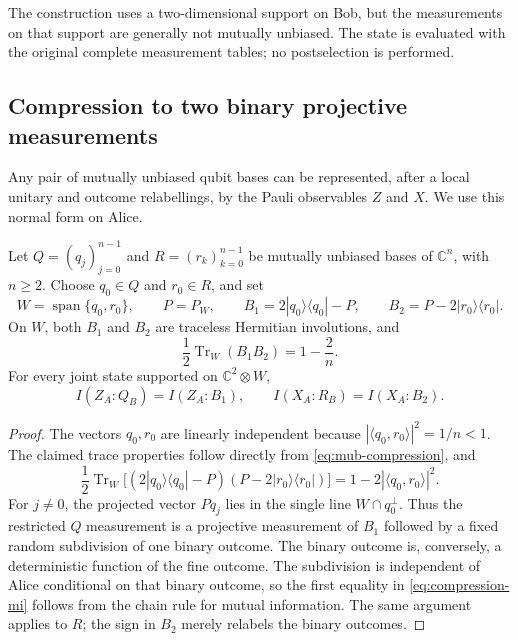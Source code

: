 The construction uses a two-dimensional support on Bob, but the
measurements on that support are generally not mutually unbiased.
The state is evaluated with the original complete measurement tables;
no postselection is performed.

\subsection{Compression to two binary projective measurements}
\label{sec:compression}

Any pair of mutually unbiased qubit bases can be represented, after a
local unitary and outcome relabellings, by the Pauli observables $Z$ and
$X$.  We use this normal form on Alice.

\begin{lemma}
\label{lem:binary-compression}
 Let $Q=(q_j)_{j=0}^{n-1}$ and $R=(r_k)_{k=0}^{n-1}$ be mutually
 unbiased bases of $\mathbb C^n$, with $n\geq2$.  Choose $q_0\in Q$ and
 $r_0\in R$, and set
 \begin{equation}
  W=\operatorname{span}\{q_0,r_0\},\qquad P=P_W,
  \qquad B_1=2|q_0\rangle\langle q_0|-P,
  \qquad B_2=P-2|r_0\rangle\langle r_0|.
  \label{eq:mub-compression}
 \end{equation}
 On $W$, both $B_1$ and $B_2$ are traceless Hermitian involutions, and
 \begin{equation}
  \frac12\operatorname{Tr}_W(B_1B_2)=1-\frac2n.
  \label{eq:compressed-overlap}
 \end{equation}
 For every joint state supported on $\mathbb C^2\otimes W$,
 \begin{equation}
  I(Z_A:Q_B)=I(Z_A:B_1),\qquad
  I(X_A:R_B)=I(X_A:B_2).
  \label{eq:compression-mi}
 \end{equation}
\end{lemma}

\begin{proof}
 The vectors $q_0,r_0$ are linearly independent because
 $|\langle q_0,r_0\rangle|^2=1/n<1$.  The claimed trace properties
 follow directly from \eqref{eq:mub-compression}, and
 \[
  \frac12\operatorname{Tr}_W
  \bigl[(2|q_0\rangle\langle q_0|-P)
  (P-2|r_0\rangle\langle r_0|)\bigr]
  =1-2|\langle q_0,r_0\rangle|^2.
 \]
 For $j\ne0$, the projected vector $Pq_j$ lies in the single line
 $W\cap q_0^\perp$.  Thus the restricted $Q$ measurement is a
 projective measurement of $B_1$ followed by a fixed random subdivision
 of one binary outcome.  The binary outcome is, conversely, a
 deterministic function of the fine outcome.  The subdivision is
 independent of Alice conditional on that binary outcome, so the first
 equality in \eqref{eq:compression-mi} follows from the chain rule for
 mutual information.  The same argument applies to $R$; the sign in
 $B_2$ merely relabels the binary outcomes.
\end{proof}

